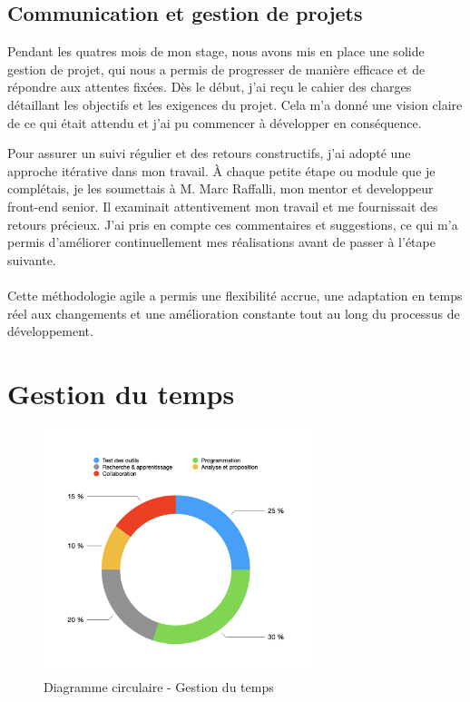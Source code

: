 \subsection*{Communication et gestion de projets}

Pendant les quatres mois de mon stage, nous avons mis en place une solide gestion de projet, qui nous a permis de progresser de manière efficace et de répondre aux attentes fixées. Dès le début, j’ai reçu le cahier des charges détaillant les objectifs et les exigences du projet. Cela m’a donné une vision claire de ce qui était attendu et j’ai pu commencer à développer en conséquence.

Pour assurer un suivi régulier et des retours constructifs, j’ai adopté une approche itérative dans mon travail. À chaque petite étape ou module que je complétais, je les soumettais à M. Marc Raffalli, mon mentor et developpeur front-end senior. Il examinait attentivement mon travail et me fournissait des retours précieux. J’ai pris en compte ces commentaires et suggestions, ce qui m’a permis d’améliorer continuellement mes réalisations avant de passer à l’étape suivante.
\\ \\
Cette méthodologie agile a permis une flexibilité accrue, une adaptation en temps réel aux changements et une amélioration constante tout au long du processus de développement.
\section{Gestion du temps}

\begin{figure}[h] 
    \centering
    \includegraphics[width=0.7\textwidth]{Includes/Images/gestionTemps.png}
    \caption{Diagramme circulaire - Gestion du temps}
    \label{fig:Diagramme circulaire - Gestion du temps}
\end{figure}  

